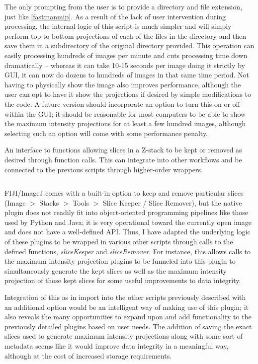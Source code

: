 The only prompting from the user is to provide a directory and file extension, just like \autoref{fastmanmip}. As a result of the lack of user intervention during processing, the internal logic of this script is much simpler and will simply perform top-to-bottom projections of each of the files in the directory and then save them in a subdirectory of the original directory provided. This operation can easily processing hundreds of images per minute and cuts processing time down dramatically -- whereas it can take 10-15 seconds per image doing it strictly by GUI, it can now do dozens to hundreds of images in that same time period. Not having to physically show the image also improves performance, although the user can opt to have it show the projections if desired by simple modifications to the code. A future version should incorporate an option to turn this on or off within the GUI; it should be reasonable for most computers to be able to show the maximum intensity projections for at least a few hundred images, although selecting such an option will come with some performance penalty.

\begin{code}
\caption{An interface to functions allowing slices in a Z-stack to be kept or removed as desired through function calls. This can integrate into other workflows and be connected to the previous scripts through higher-order wrappers.}
\label{reslicer}

\inputminted[breaklines,frame=single,fontsize=\small]{python}{source/reSlicer.py}

\end{code}

FIJI/ImageJ comes with a built-in option to keep and remove particular slices (Image $>$ Stacks $>$ Tools $>$ Slice Keeper / Slice Remover), but the native plugin does not readily fit into object-oriented programming pipelines like those used by Python and Java; it is very operational toward the currently open image and does not have a well-defined API. Thus, I have adapted the underlying logic of these plugins to be wrapped in various other scripts through calls to the defined functions, \textit{sliceKeeper} and \textit{sliceRemover}. For instance, this allows calls to the maximum intensity projection plugins to be funneled into this plugin to simultaneously generate the kept slices as well as the maximum intensity projection of those kept slices for some useful improvements to data integrity. 

Integration of this as in import into the other scripts previously described with an additional option would be an intelligent way of making use of this plugin; it also reveals the many opportunities to expand upon and add functionality to the previously detailed plugins based on user needs. The addition of saving the exact slices used to generate maximum intensity projections along with some sort of metadata seems like it would improve data integrity in a meaningful way, although at the cost of increased storage requirements.

